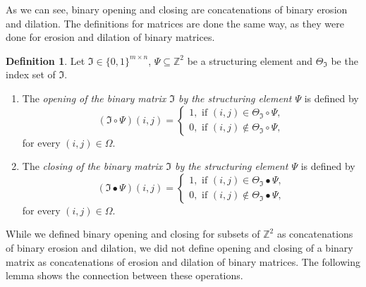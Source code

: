 \documentclass[a4paper,12pt]{article}
\theoremstyle{plain}
\theoremstyle{definition}
\newtheorem{definition}[theorem]{Definition}
\begin{document}
As we can see, binary opening and closing are concatenations of binary erosion and dilation. The definitions for matrices are done the same way, as they were done for erosion and dilation of binary matrices.

\begin{definition}
	Let $\mathfrak{I} \in \{ 0, 1 \}^{m \times n}$, $\Psi \subseteq \mathbb{Z}^2$ be a structuring element and $\Theta_\mathfrak{I}$ be the index set of $\mathfrak{I}$.
	\begin{enumerate}
		\item The \emph{opening of the binary matrix $\mathfrak{I}$ by the structuring element $\Psi$} is defined by
		\begin{equation}
			(\mathfrak{I} \circ \Psi)(i, j) =
			\begin{cases}
				1, \textrm{ if } (i, j) \in \Theta_\mathfrak{I} \circ \Psi, \\
				0, \textrm{ if } (i, j) \notin \Theta_\mathfrak{I} \circ \Psi,
			\end{cases}
		\end{equation}
		for every $(i, j) \in \Omega$.
		\item The \emph{closing of the binary matrix $\mathfrak{I}$ by the structuring element $\Psi$} is defined by
		\begin{equation}
			(\mathfrak{I} \bullet \Psi)(i, j) =
			\begin{cases}
				1, \textrm{ if } (i, j) \in \Theta_\mathfrak{I} \bullet \Psi, \\
				0, \textrm{ if } (i, j) \notin \Theta_\mathfrak{I} \bullet \Psi,
			\end{cases}
		\end{equation}
		for every $(i, j) \in \Omega$.
	\end{enumerate}
\end{definition}

While we defined binary opening and closing for subsets of $\mathbb{Z}^2$ as concatenations of binary erosion and dilation, we did not define opening and closing of a binary matrix as concatenations of erosion and dilation of binary matrices. The following lemma shows the connection between these operations.
\end{document}
